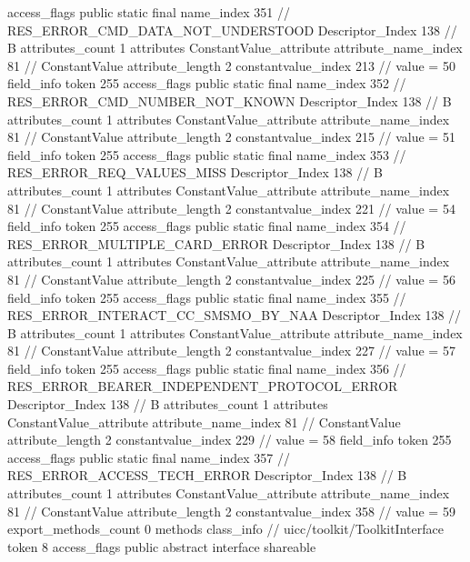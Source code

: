 {{{{{				access_flags	public static final
				name_index	351		// RES_ERROR_CMD_DATA_NOT_UNDERSTOOD
				Descriptor_Index	138		// B
				attributes_count	1
				attributes {
				ConstantValue_attribute {
					attribute_name_index	81		// ConstantValue
					attribute_length	2
					constantvalue_index	213		// value = 50
				}
				}
			}
			field_info {
				token	255
				access_flags	public static final
				name_index	352		// RES_ERROR_CMD_NUMBER_NOT_KNOWN
				Descriptor_Index	138		// B
				attributes_count	1
				attributes {
				ConstantValue_attribute {
					attribute_name_index	81		// ConstantValue
					attribute_length	2
					constantvalue_index	215		// value = 51
				}
				}
			}
			field_info {
				token	255
				access_flags	public static final
				name_index	353		// RES_ERROR_REQ_VALUES_MISS
				Descriptor_Index	138		// B
				attributes_count	1
				attributes {
				ConstantValue_attribute {
					attribute_name_index	81		// ConstantValue
					attribute_length	2
					constantvalue_index	221		// value = 54
				}
				}
			}
			field_info {
				token	255
				access_flags	public static final
				name_index	354		// RES_ERROR_MULTIPLE_CARD_ERROR
				Descriptor_Index	138		// B
				attributes_count	1
				attributes {
				ConstantValue_attribute {
					attribute_name_index	81		// ConstantValue
					attribute_length	2
					constantvalue_index	225		// value = 56
				}
				}
			}
			field_info {
				token	255
				access_flags	public static final
				name_index	355		// RES_ERROR_INTERACT_CC_SMSMO_BY_NAA
				Descriptor_Index	138		// B
				attributes_count	1
				attributes {
				ConstantValue_attribute {
					attribute_name_index	81		// ConstantValue
					attribute_length	2
					constantvalue_index	227		// value = 57
				}
				}
			}
			field_info {
				token	255
				access_flags	public static final
				name_index	356		// RES_ERROR_BEARER_INDEPENDENT_PROTOCOL_ERROR
				Descriptor_Index	138		// B
				attributes_count	1
				attributes {
				ConstantValue_attribute {
					attribute_name_index	81		// ConstantValue
					attribute_length	2
					constantvalue_index	229		// value = 58
				}
				}
			}
			field_info {
				token	255
				access_flags	public static final
				name_index	357		// RES_ERROR_ACCESS_TECH_ERROR
				Descriptor_Index	138		// B
				attributes_count	1
				attributes {
				ConstantValue_attribute {
					attribute_name_index	81		// ConstantValue
					attribute_length	2
					constantvalue_index	358		// value = 59
				}
				}
			}
			}
			export_methods_count	0
			methods {
			}
		}
		class_info {		// uicc/toolkit/ToolkitInterface
			token	8
			access_flags	public abstract interface shareable
}}}

